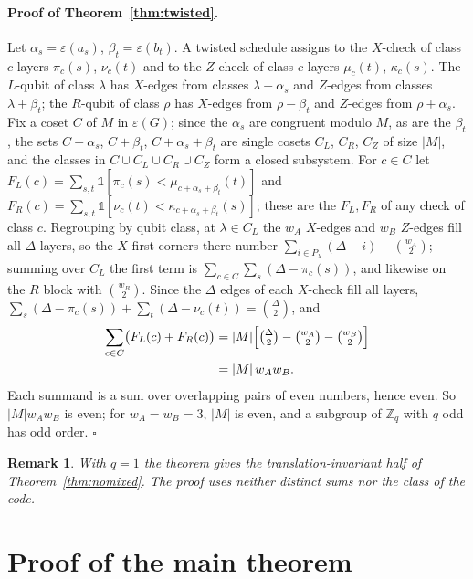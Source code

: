 \documentclass[reprint,twocolumn,superscriptaddress,nofootinbib]{revtex4-2}
\theoremstyle{plain}
\newtheorem*{remarkSI}{Remark}
\newcommand{\Zq}{\mathbb{Z}_q}
\newcommand{\wA}{w_A}                  %
\newcommand{\wB}{w_B}
\begin{document}
\paragraph*{Proof of Theorem~\ref{thm:twisted}.}
Let $\alpha_s=\varepsilon(a_s)$, $\beta_t=\varepsilon(b_t)$. A twisted
schedule assigns to the $X$-check of class $c$ layers $\pi_c(s)$,
$\nu_c(t)$ and to the $Z$-check of class $c$ layers $\mu_c(t)$,
$\kappa_c(s)$. The $L$-qubit of class $\lambda$ has $X$-edges from classes
$\lambda-\alpha_s$ and $Z$-edges from classes $\lambda+\beta_t$; the
$R$-qubit of class $\rho$ has $X$-edges from $\rho-\beta_t$ and $Z$-edges
from $\rho+\alpha_s$. Fix a coset $C$ of $M$ in $\varepsilon(G)$; since the
$\alpha_s$ are congruent modulo $M$, as are the $\beta_t$, the sets
$C+\alpha_s$, $C+\beta_t$, $C+\alpha_s+\beta_t$ are single cosets $C_L$,
$C_R$, $C_Z$ of size $|M|$, and the classes in $C\cup C_L\cup C_R\cup C_Z$
form a closed subsystem. For $c\in C$ let
$F_L(c)=\sum_{s,t}\mathbb{1}[\pi_c(s)<\mu_{c+\alpha_s+\beta_t}(t)]$ and
$F_R(c)=\sum_{s,t}\mathbb{1}[\nu_c(t)<\kappa_{c+\alpha_s+\beta_t}(s)]$;
these are the $F_L,F_R$ of any check of class $c$. Regrouping by qubit
class, at $\lambda\in C_L$ the $\wA$ $X$-edges and $\wB$ $Z$-edges fill
all $\Delta$ layers, so the $X$-first corners there number
$\sum_{i\in P_\lambda}(\Delta-i)-\binom{\wA}{2}$; summing over $C_L$ the
first term is $\sum_{c\in C}\sum_s(\Delta-\pi_c(s))$, and likewise on the
$R$ block with $\binom{\wB}{2}$. Since the $\Delta$ edges of each $X$-check
fill all layers, $\sum_s(\Delta-\pi_c(s))+\sum_t(\Delta-\nu_c(t))=
\binom{\Delta}{2}$, and
\begin{equation}
\begin{aligned}
\sum_{c\in C}\bigl(F_L(c)+F_R(c)\bigr)
&=|M|\Bigl[\tbinom{\Delta}{2}-\tbinom{\wA}{2}-\tbinom{\wB}{2}\Bigr]\\
&=|M|\,\wA\wB .
\end{aligned}
\end{equation}
Each summand is a sum over overlapping pairs of even numbers, hence even.
So $|M|\wA\wB$ is even; for $\wA=\wB=3$, $|M|$ is even, and a subgroup of
$\Zq$ with $q$ odd has odd order. \hfill$\square$

\begin{remarkSI}
With $q=1$ the theorem gives the translation-invariant half of
Theorem~\ref{thm:nomixed}. The proof uses neither distinct sums nor the
class of the code.
\end{remarkSI}

\section{Proof of the main theorem}
\label{si:main}
\end{document}
